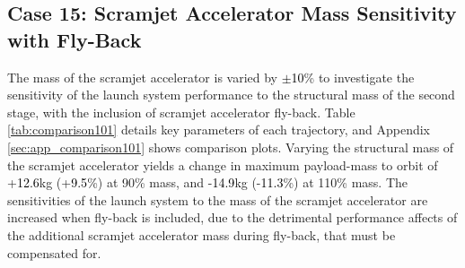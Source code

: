 \subsection{Case 15: Scramjet Accelerator Mass Sensitivity with Fly-Back}\label{sec:m2var}
\noindent
The mass of the scramjet accelerator is varied by \textcolor{black}{$\pm$10}\% to investigate the sensitivity of the launch system performance to the structural mass of the second stage, with the inclusion of scramjet accelerator fly-back.
Table \ref{tab:comparison101} details key parameters of each trajectory, and Appendix \ref{sec:app_comparison101} shows comparison plots.
Varying the structural mass of the scramjet accelerator yields a change in maximum payload-mass to orbit of +\textcolor{black}{12.6}kg (+\textcolor{black}{9.5}\%) at 90\% mass, and -\textcolor{black}{14.9}kg (-\textcolor{black}{11.3}\%) at 110\% mass. The sensitivities of the launch system to the mass of the scramjet accelerator are increased when fly-back is included, due to the detrimental performance affects of the additional scramjet accelerator mass during fly-back, that must be compensated for. 

